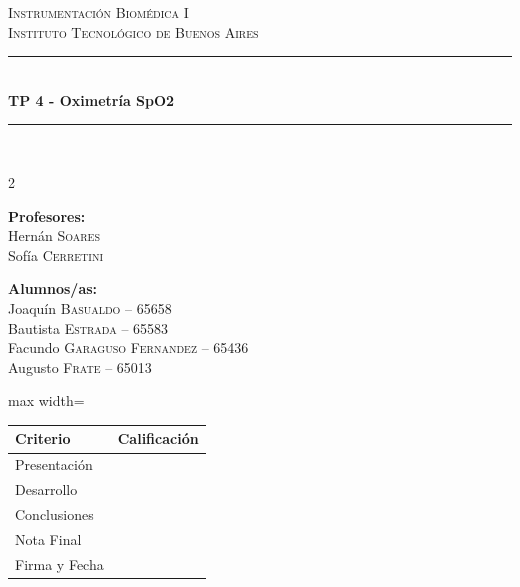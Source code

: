 \documentclass[10pt]{article}
\newcommand{\materia}{Instrumentación Biomédica I}
\newcommand{\institucion}{Instituto Tecnológico de Buenos Aires}
\newcommand{\numeroTP}{4}
\newcommand{\nombreTP}{Oximetría SpO2}
\newcommand{\HRule}{\rule{\linewidth}{0.5mm}}
\begin{document}
\begin{center}

\textsc{\LARGE \materia}\\[0.2cm]
\textsc{\Large \institucion}\\[0.2cm]

\HRule \\[0.2cm]
{\huge\bfseries TP \numeroTP{} - \nombreTP}\\[0.2cm]
\HRule \\[1cm]

\begin{multicols}{2}

\begin{flushleft}
    \large
    \textbf{Profesores:}\\
    Hernán \textsc{Soares}\\
    Sofía \textsc{Cerretini}
\end{flushleft}

\columnbreak

\begin{flushleft}
    \large
    \textbf{Alumnos/as:}\\
    Joaquín \textsc{Basualdo} -- 65658\\
    Bautista \textsc{Estrada} -- 65583\\
    Facundo \textsc{Garaguso Fernandez} -- 65436\\
    Augusto \textsc{Frate} -- 65013
\end{flushleft}

\end{multicols}

\vspace{0.5cm}

\renewcommand{\arraystretch}{1.6}

\begin{adjustbox}{max width=\textwidth}
\begin{tabular}{|p{6cm}|p{7cm}|}
\hline
\textbf{Criterio} & \textbf{Calificación} \\ \hline
Presentación & \\ \hline
Desarrollo & \\ \hline
Conclusiones & \\ \hline
Nota Final & \\ \hline\hline
Firma y Fecha & \\ \hline
\end{tabular}
\end{adjustbox}

\end{center}
\end{document}
